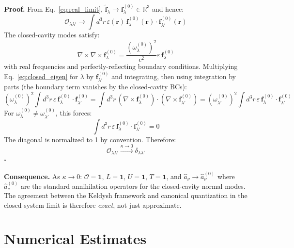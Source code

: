\documentclass[12pt]{article}
\newcommand{\tf}{\tilde{\mathbf{f}}}
\begin{document}
\textbf{Proof.}  From Eq.~\eqref{eq:real_limit}, $\tf_\lambda\to
\mathbf{f}^{(0)}_\lambda\in\mathbb{R}^3$ and hence:
\begin{equation}
  \mathcal{O}_{\lambda\lambda'} \to
  \int d^3r\,\varepsilon(\mathbf{r})\,
  \mathbf{f}^{(0)}_\lambda(\mathbf{r})\cdot\mathbf{f}^{(0)}_{\lambda'}(\mathbf{r})
  \label{eq:O_limit}
\end{equation}
The closed-cavity modes satisfy:
\begin{equation}
  \nabla\times\nabla\times\mathbf{f}^{(0)}_\lambda =
  \frac{(\omega_\lambda^{(0)})^2}{c^2}\varepsilon\,\mathbf{f}^{(0)}_\lambda
  \label{eq:closed_eigen}
\end{equation}
with real frequencies and perfectly-reflecting boundary conditions.
Multiplying Eq.~\eqref{eq:closed_eigen} for $\lambda$ by
$\mathbf{f}^{(0)}_{\lambda'}$ and integrating, then using integration by
parts (the boundary term vanishes by the closed-cavity BCs):
\begin{equation}
  (\omega_\lambda^{(0)})^2
  \int d^3r\,\varepsilon\,\mathbf{f}^{(0)}_\lambda\cdot\mathbf{f}^{(0)}_{\lambda'}
  = \int d^3r\,(\nabla\times\mathbf{f}^{(0)}_\lambda)\cdot
  (\nabla\times\mathbf{f}^{(0)}_{\lambda'})
  = (\omega_{\lambda'}^{(0)})^2
  \int d^3r\,\varepsilon\,\mathbf{f}^{(0)}_\lambda\cdot\mathbf{f}^{(0)}_{\lambda'}
\end{equation}
For $\omega_\lambda^{(0)}\neq\omega_{\lambda'}^{(0)}$, this forces:
\begin{equation}
  \int d^3r\,\varepsilon\,\mathbf{f}^{(0)}_\lambda\cdot\mathbf{f}^{(0)}_{\lambda'}
  = 0
\end{equation}
The diagonal is normalized to 1 by convention.  Therefore:
\begin{equation}
  \boxed{\mathcal{O}_{\lambda\lambda'}\xrightarrow{\kappa\to 0}
  \delta_{\lambda\lambda'}}
  \label{eq:O_to_delta}
\end{equation}
$\square$

\textbf{Consequence.}  As $\kappa\to 0$: $\mathcal{O}=\mathbf{1}$,
$L=\mathbf{1}$, $U=\mathbf{1}$, $T=\mathbf{1}$, and
$\hat{a}_\nu\to\hat{a}_\nu^{(0)}$ where $\hat{a}_\nu^{(0)}$ are the
standard annihilation operators for the closed-cavity normal modes.
The agreement between the Keldysh framework and canonical quantization
in the closed-system limit is therefore \emph{exact}, not just
approximate.

\section{Numerical Estimates}
\label{sec:numerics}
\end{document}
